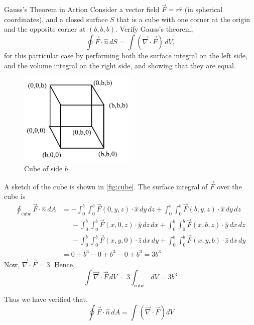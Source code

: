 \documentclass{esg8022pset}
\begin{document}
\begin{problem}{Gauss's Theorem in Action}
  Consider a vector field
  $\vec{F} = r\hat{r}$ (in spherical coordinates), and a closed
  surface $S$ that is a cube with one corner at the origin and the
  opposite corner at $(b,b,b)$.  Verify Gauss's theorem,
  $$\oint \vec{F}\cdot\hat{n}\,dS = \int (\vec{\nabla}\cdot\vec{F})\,dV,$$
  for this particular case by performing both the surface integral on the
  left side, and the volume integral on the right side, and showing that
  they are equal.
\end{problem}
\begin{solution}
  \begin{figure}[h]
    \centering
    \includegraphics[width=0.5\textwidth]{ps03_sol_04}
    \caption{Cube of side $b$}
    \label{fig:cube}
  \end{figure}
  A sketch of the cube is shown in \autoref{fig:cube}. The surface integral of $\vec{F}$ over the cube is
  \begin{align*}
    \mathop{\oint}_{\text{cube}}\vec{F}\cdot\hat{n}\,dA & = -\int_{0}^b\int_{0}^b\vec{F}(0,y,z)\cdot \hat x\,dy\,dz + \int_{0}^b\int_{0}^b\vec{F}(b,y,z)\cdot \hat x\,dy\,dz \\
    & \phantom{=} -\int_{0}^b\int_{0}^b\vec{F}(x,0,z)\cdot \hat y\,dz\,dx + \int_{0}^b\int_{0}^b\vec{F}(x,b,z)\cdot \hat y\,dx\,dz \\
    & \phantom{=} -\int_{0}^b\int_{0}^b\vec{F}(x,y,0)\cdot \hat z\,dx\,dy + \int_{0}^b\int_{0}^b\vec{F}(x,y,b)\cdot \hat z\,dx\,dy \\
    & = 0 + b^3 -0 + b^3 - 0 + b^3 = 3 b^3
  \end{align*}
  Now, $\vec{\nabla}\cdot \vec{F} =3$. Hence,
  $$\int \vec{\nabla}\cdot \vec{F}\,dV = 3 \mathop{\int}_{\text{cube}}\,dV = 3 b^3$$
  
  Thus we have verified that,
  $$\oint \vec{F}\cdot\hat{n}\,dA = \int (\vec{\nabla}\cdot\vec{F}) dV$$ 
\end{solution}
\end{document}

